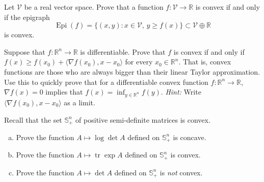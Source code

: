 \documentclass[12pt,letterpaper,cm]{hmcpset}
\newcommand\R{\mathbb{R}}
\newcommand\Epi{\operatorname{Epi}}
\newcommand\inner[1]{\langle #1 \rangle}
\renewcommand\S{\mathbb{S}}
\newcommand\tr{\operatorname{tr}}
\begin{document}
\begin{problem}[1]
    Let $\mathcal{V}$ be a real vector space. Prove that
    a function $f : \mathcal{V} \to \R$ is convex if and only if
    the epigraph
    \[
        \Epi(f) = \bigl\{(x,y) : x\in\mathcal{V},\,y\geq f(x)\bigr\}\subset \mathcal{V}\oplus\R
    \]
    is convex.
\end{problem}

\begin{solution}
    \vfill
\end{solution}

\begin{problem}[2]
    Suppose that $f : \R^n\to\R$ is differentiable. Prove that $f$ is convex
    if and only if $f(x) \geq f(x_0) + \inner{\nabla f(x_0), x-x_0}$ for every
    $x_0\in\R^n$. That is, convex functions are those who are always bigger than
    their linear Taylor approximation. Use this to quickly prove that for a differentiable
    convex function $f : \R^n\to\R$, $\nabla f(x) = 0$ implies that $f(x) = \inf_{y\in\R^n}f(y)$.
    \emph{Hint:} Write $\inner{\nabla f(x_0),x-x_0}$ as a limit.
\end{problem}

\begin{solution}
    \vfill
\end{solution}

\begin{problem}[3]
    Recall that the set $\S_+^n$ of positive semi-definite matrices is convex.
\begin{enumerate}[(a)]
    \item Prove the function $A \mapsto \log\det A$ defined on $\S_+^n$ is concave.
    \item Prove the function $A \mapsto \tr\exp A$ defined on $\S_+^n$ is convex.
    \item Prove the function $A \mapsto \det A$ defined on $\S_+^n$ is \emph{not} convex.
\end{enumerate}
\end{problem}

\begin{solution}
    \vfill
\end{solution}
\end{document}
